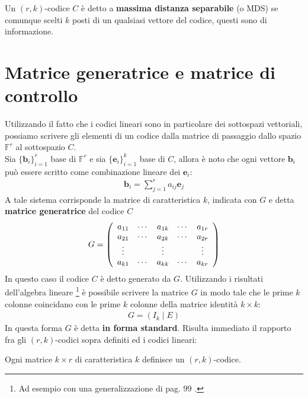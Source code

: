 \begin{definizione}
   Un $(r,k)$-codice $C$ è detto a {\bf massima distanza separabile} (o MDS) se comunque scelti $k$ posti di un qualsiasi vettore del codice, questi sono di informazione. 
\end{definizione}


\section{Matrice generatrice e matrice di controllo}

Utilizzando il fatto che i codici lineari sono in particolare dei sottospazi vettoriali, possiamo scrivere gli elementi di un codice dalla matrice di passaggio dallo spazio $\mathbb{F}^{r} $ al sottospazio $C$. \\
Sia $\lbrace \mathbf{b}_{i} \rbrace_{i=1}^{r}$ base di $\mathbb{F}^{r}$ e sia $\lbrace \mathbf{e}_{i} \rbrace_{i=1}^{k}$ base di $C$, allora è noto che ogni vettore $\mathbf{b}_{i}$ può essere scritto come combinazione lineare dei $\mathbf{e}_{i}$:
\begin{align*}
   \mathbf{b}_{i} = \sum_{j=1}^{r} a_{ij} \mathbf{e}_{j}  
\end{align*}
A tale sistema corrisponde la matrice di caratteristica $k$, indicata con $G$ e detta {\bf matrice generatrice} del codice $C$
\begin{align*}
  G =
  \left(
  \begin{array} {c c c c c}
  a_{11} & \cdots & a_{1k} & \cdots & a_{1r} \\
  a_{21} & \cdots & a_{2k} & \cdots & a_{2r} \\
  \vdots &  & \vdots & & \vdots \\
  a_{k1} & \cdots & a_{kk} & \cdots & a_{kr} 
  \end{array}
  \right)
\end{align*}
In questo caso il codice $C$ è detto generato da $G$.
Utilizzando i risultati dell'algebra lineare
\footnote{Ad esempio con una generalizzazione di pag. 99 \cite{stoka}.}
è possibile scrivere la matrice $G$ in modo tale che le prime $k$ colonne coincidano con le prime $k$ colonne della matrice identità $k\times k$: 
\begin{align*}
   G = (I_{k} \mid E)
\end{align*} 
In questa forma $G$ è detta {\bf in forma standard}.
Risulta immediato il rapporto fra gli $(r,k)$-codici sopra definiti ed i codici lineari:
\begin{teorema}
   Ogni matrice $k\times r$ di caratteristica $k$ definisce un $(r,k)$-codice.
\end{teorema}
